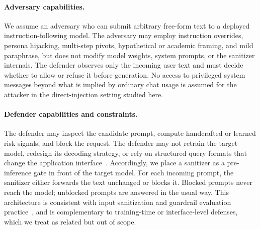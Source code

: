\paragraph{Adversary capabilities.}
We assume an adversary who can submit arbitrary free-form text to a deployed instruction-following model.
The adversary may employ instruction overrides, persona hijacking, multi-step pivots, hypothetical or academic framing, and mild paraphrase, but does not modify model weights, system prompts, or the sanitizer internals.
The defender observes only the incoming user text and must decide whether to allow or refuse it before generation.
No access to privileged system messages beyond what is implied by ordinary chat usage is assumed for the attacker in the direct-injection setting studied here.

\paragraph{Defender capabilities and constraints.}
The defender may inspect the candidate prompt, compute handcrafted or learned risk signals, and block the request.
The defender may not retrain the target model, redesign its decoding strategy, or rely on structured query formats that change the application interface~\cite{struq2024,secalign2024}.
Accordingly, we place a sanitizer as a pre-inference gate in front of the target model.
For each incoming prompt, the sanitizer either forwards the text unchanged or blocks it.
Blocked prompts never reach the model; unblocked prompts are answered in the usual way.
This architecture is consistent with input sanitization and guardrail evaluation practice~\cite{chowdhury2025prepsilonepsilonmptsanitizingsensitiveprompts,geng2025pisanitizer,shi2025promptarmor,zizzo2025adversarial}, and is complementary to training-time or interface-level defenses, which we treat as related but out of scope.

